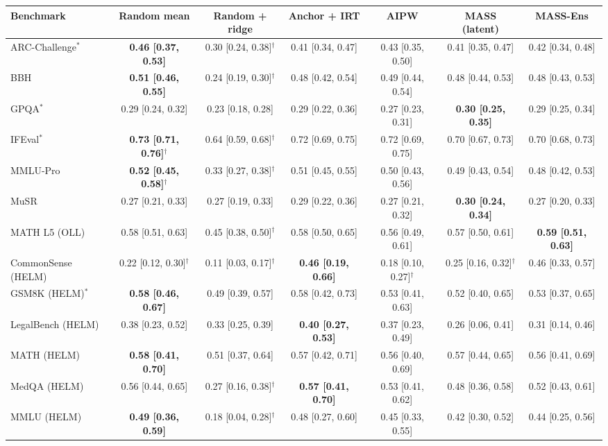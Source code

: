 \begin{tabular}{lcccccc}
\toprule
Benchmark & Random mean & Random + ridge & Anchor + IRT & AIPW & MASS (latent) & MASS-Ens \\
\midrule
ARC-Challenge$^*$ & \textbf{0.46 [0.37, 0.53]} & 0.30 [0.24, 0.38]$^\dagger$ & 0.41 [0.34, 0.47] & 0.43 [0.35, 0.50] & 0.41 [0.35, 0.47] & 0.42 [0.34, 0.48] \\
BBH & \textbf{0.51 [0.46, 0.55]} & 0.24 [0.19, 0.30]$^\dagger$ & 0.48 [0.42, 0.54] & 0.49 [0.44, 0.54] & 0.48 [0.44, 0.53] & 0.48 [0.43, 0.53] \\
GPQA$^*$ & 0.29 [0.24, 0.32] & 0.23 [0.18, 0.28] & 0.29 [0.22, 0.36] & 0.27 [0.23, 0.31] & \textbf{0.30 [0.25, 0.35]} & 0.29 [0.25, 0.34] \\
IFEval$^*$ & \textbf{0.73 [0.71, 0.76]$^\dagger$} & 0.64 [0.59, 0.68]$^\dagger$ & 0.72 [0.69, 0.75] & 0.72 [0.69, 0.75] & 0.70 [0.67, 0.73] & 0.70 [0.68, 0.73] \\
MMLU-Pro & \textbf{0.52 [0.45, 0.58]$^\dagger$} & 0.33 [0.27, 0.38]$^\dagger$ & 0.51 [0.45, 0.55] & 0.50 [0.43, 0.56] & 0.49 [0.43, 0.54] & 0.48 [0.42, 0.53] \\
MuSR & 0.27 [0.21, 0.33] & 0.27 [0.19, 0.33] & 0.29 [0.22, 0.36] & 0.27 [0.21, 0.32] & \textbf{0.30 [0.24, 0.34]} & 0.27 [0.20, 0.33] \\
MATH L5 (OLL) & 0.58 [0.51, 0.63] & 0.45 [0.38, 0.50]$^\dagger$ & 0.58 [0.50, 0.65] & 0.56 [0.49, 0.61] & 0.57 [0.50, 0.61] & \textbf{0.59 [0.51, 0.63]} \\
CommonSense (HELM) & 0.22 [0.12, 0.30]$^\dagger$ & 0.11 [0.03, 0.17]$^\dagger$ & \textbf{0.46 [0.19, 0.66]} & 0.18 [0.10, 0.27]$^\dagger$ & 0.25 [0.16, 0.32]$^\dagger$ & 0.46 [0.33, 0.57] \\
GSM8K (HELM)$^*$ & \textbf{0.58 [0.46, 0.67]} & 0.49 [0.39, 0.57] & 0.58 [0.42, 0.73] & 0.53 [0.41, 0.63] & 0.52 [0.40, 0.65] & 0.53 [0.37, 0.65] \\
LegalBench (HELM) & 0.38 [0.23, 0.52] & 0.33 [0.25, 0.39] & \textbf{0.40 [0.27, 0.53]} & 0.37 [0.23, 0.49] & 0.26 [0.06, 0.41] & 0.31 [0.14, 0.46] \\
MATH (HELM) & \textbf{0.58 [0.41, 0.70]} & 0.51 [0.37, 0.64] & 0.57 [0.42, 0.71] & 0.56 [0.40, 0.69] & 0.57 [0.44, 0.65] & 0.56 [0.41, 0.69] \\
MedQA (HELM) & 0.56 [0.44, 0.65] & 0.27 [0.16, 0.38]$^\dagger$ & \textbf{0.57 [0.41, 0.70]} & 0.53 [0.41, 0.62] & 0.48 [0.36, 0.58] & 0.52 [0.43, 0.61] \\
MMLU (HELM) & \textbf{0.49 [0.36, 0.59]} & 0.18 [0.04, 0.28]$^\dagger$ & 0.48 [0.27, 0.60] & 0.45 [0.33, 0.55] & 0.42 [0.30, 0.52] & 0.44 [0.25, 0.56] \\
\bottomrule
\end{tabular}
